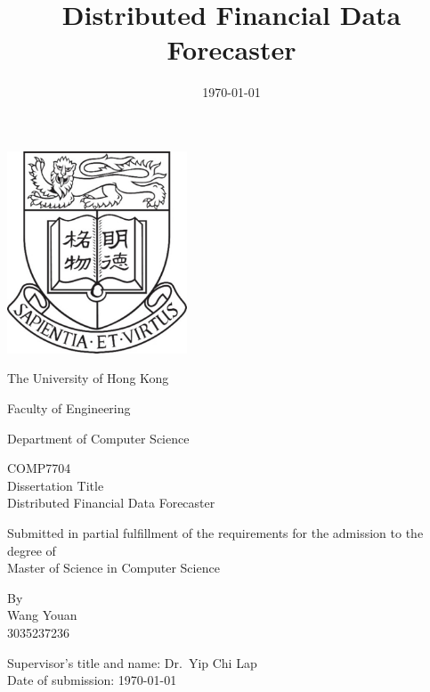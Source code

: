 \documentclass[a4paper, 12pt, oneside]{Thesis}  %
\begin{document}
\frontmatter      %

\title  {Distributed Financial Data Forecaster}
\addresses  {\groupname\\\deptname\\\univname}  %
\date       {\today}
\subject    {Computer Science}

\begin{titlepage}
	\centering
	\includegraphics[width=0.4\textwidth]{hku-logo.png}\par\vspace{0.5cm}
	The University of Hong Kong \par
	Faculty of Engineering \par
	Department of Computer Science \par
	\vspace{1cm}
	COMP7704\\
	Dissertation Title\\
	Distributed Financial Data Forecaster\par
	\vspace{1cm}
	Submitted in partial fulfillment of the requirements for the admission to the degree of\\ 
	Master of Science in Computer Science\par
	\vfill
	By\\
	Wang Youan\\
	3035237236\par
	Supervisor's title and name: Dr.~Yip Chi Lap\\
	Date of submission: \today
\end{titlepage}
\end{document}
